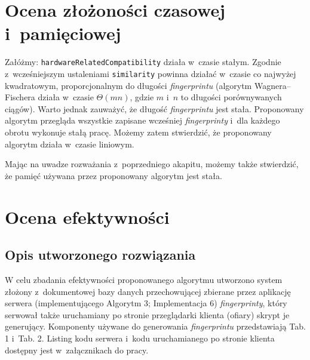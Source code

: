 \section{Ocena złożoności czasowej i~pamięciowej}
Załóżmy: \texttt{hardwareRelatedCompatibility} działa w~czasie stałym. Zgodnie
z~wcześniejszym ustaleniami \texttt{similarity} powinna działać w~czasie co
najwyżej kwadratowym, proporcjonalnym do długości \emph{fingerprintu} (algorytm
Wagnera--Fischera działa w~czasie \(\Theta(mn)\), gdzie \(m\) i~\(n\) to
długości porównywanych ciągów). Warto jednak zauważyć, że długość
\emph{fingerprintu} jest stała. Proponowany algorytm przegląda wszystkie
zapisane wcześniej \emph{fingerprinty} i~dla każdego obrotu wykonuje stałą
pracę. Możemy zatem stwierdzić, że proponowany algorytm działa w~czasie
liniowym.

Mając na uwadze rozważania z~poprzedniego akapitu, możemy także stwierdzić, że
pamięć używana przez proponowany algorytm jest stała.

\section{Ocena efektywności}

\subsection{Opis utworzonego rozwiązania}
W celu zbadania efektywności proponowanego algorytmu utworzono system złożony
z~dokumentowej bazy danych przechowującej zbierane przez aplikację serwera
(implementującego Algorytm 3; Implementacja 6) \emph{fingerprinty}, który
serwował także uruchamiany po stronie przeglądarki klienta (ofiary) skrypt je
generujący. Komponenty używane do generowania \emph{fingerprintu} przedstawiają
Tab. 1 i~Tab. 2. Listing kodu serwera i~kodu uruchamianego po stronie klienta
dostępny jest w~załącznikach do pracy.

